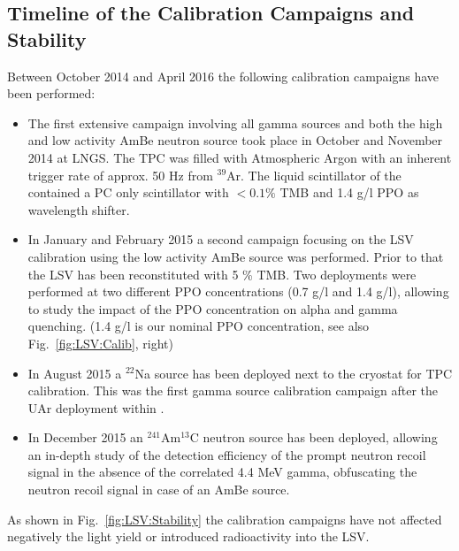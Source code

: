 \subsection{Timeline of the Calibration Campaigns and Stability}
Between October 2014 and April 2016 the following calibration campaigns have been performed:
\begin{itemize}
\item The first extensive campaign involving all gamma sources and both the high and low activity AmBe neutron source took place in October and November 2014 at LNGS. The TPC was filled with Atmospheric Argon with an inherent trigger rate of approx. 50 Hz from $^{39}$Ar. The liquid scintillator of the \lsv contained a PC only scintillator with $<0.1 \%$ TMB and 1.4 g/l PPO as wavelength shifter.

\item In January and February 2015 a second campaign focusing on the LSV calibration using the low activity AmBe source was performed. Prior to that the LSV has been reconstituted with 5 \% TMB. Two deployments were performed at two different PPO concentrations (0.7 g/l and 1.4 g/l), allowing to study the impact of the PPO concentration on alpha and gamma quenching. (1.4 g/l is our nominal PPO concentration, see also Fig.~\ref{fig:LSV:Calib}, right)

\item In August 2015 a $^{22}$Na source has been deployed next to the cryostat for TPC calibration. This was the first gamma source calibration campaign after the UAr deployment within \dsf.
\item In December 2015 an $^{241}$Am$^{13}$C neutron source has been deployed, allowing an in-depth study of the detection efficiency of the prompt neutron recoil signal in the absence of the correlated 4.4 MeV gamma, obfuscating the neutron recoil signal in case of an AmBe source.
\end{itemize}

As shown in Fig.~\ref{fig:LSV:Stability} the calibration campaigns have not affected negatively the light yield or introduced radioactivity into the LSV.

